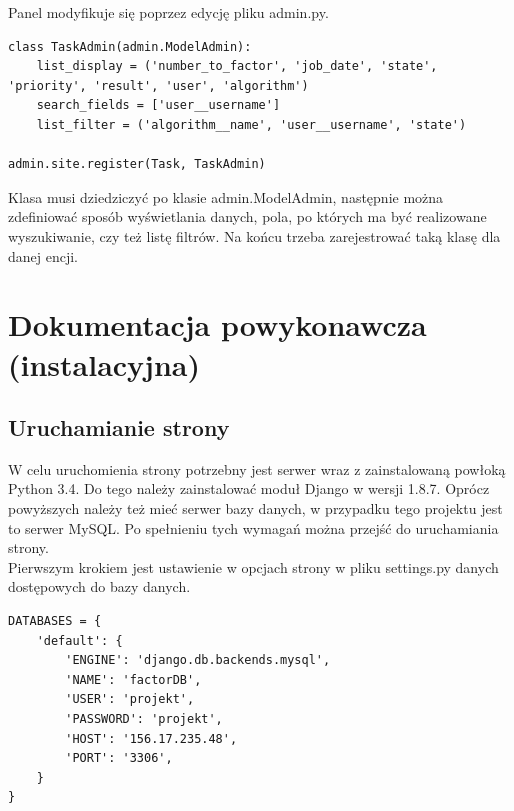 \documentclass{article}
\begin{document}
Panel modyfikuje się poprzez edycję pliku admin.py.

\begin{lstlisting}
class TaskAdmin(admin.ModelAdmin):
    list_display = ('number_to_factor', 'job_date', 'state', 'priority', 'result', 'user', 'algorithm')
    search_fields = ['user__username']
    list_filter = ('algorithm__name', 'user__username', 'state')

admin.site.register(Task, TaskAdmin)
\end{lstlisting}

Klasa musi dziedziczyć po klasie admin.ModelAdmin, następnie można zdefiniować sposób wyświetlania danych, pola, po których ma być realizowane wyszukiwanie, czy też listę filtrów. Na końcu trzeba zarejestrować taką klasę dla danej encji.

\section{Dokumentacja powykonawcza (instalacyjna)}

\subsection{Uruchamianie strony}

W celu uruchomienia strony potrzebny jest serwer wraz z zainstalowaną powłoką Python 3.4. Do tego należy zainstalować moduł Django w wersji 1.8.7. Oprócz powyższych należy też mieć serwer bazy danych, w przypadku tego projektu jest to serwer MySQL. Po spełnieniu tych wymagań można przejść do uruchamiania strony.\\

Pierwszym krokiem jest ustawienie w opcjach strony w pliku settings.py danych dostępowych do bazy danych.
\begin{lstlisting}
DATABASES = {
    'default': {
        'ENGINE': 'django.db.backends.mysql',
        'NAME': 'factorDB',
        'USER': 'projekt',
        'PASSWORD': 'projekt',
        'HOST': '156.17.235.48',
        'PORT': '3306',
    }
}
\end{lstlisting}
\end{document}
